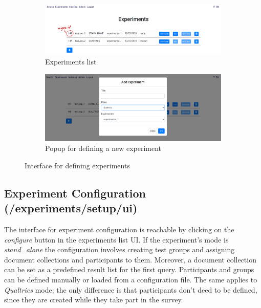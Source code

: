 \documentclass[fleqn]{article}
\begin{document}
\begin{figure} [h]
     \centering
     \begin{subfigure}[b]{0.8\textwidth}
         \centering
         \includegraphics[width=\textwidth]{img/experiments_1}
         \caption{Experiments list}
         \label{fig:experimentsUi1}
     \end{subfigure}
     \par\bigskip
     \begin{subfigure}[b]{0.8\textwidth}
         \centering
         \includegraphics[width=\textwidth]{img/experiments_2}
         \caption{Popup for defining a new experiment}
         \label{fig:experimentsUi2}
     \end{subfigure}
     \caption{Interface for defining experiments}
     \label{fig:experimentsUi}
\end{figure}


\subsection{Experiment Configuration \small{(/experiments/setup/ui)}}

The interface for experiment configuration is reachable by clicking on the \emph{configure} button in the
experiments list UI. If the experiment's mode is \emph{stand\_alone} the configuration involves creating test groups and assigning 
document collections and participants to them. Moreover, a document collection can be set as a predefined result list for the first query.
Participants and groups can be defined manually or loaded from a configuration file. The same applies to \emph{Qualtrics} mode; the only difference is that 
participants don't deed to be defined, since they are created while
they take part in the survey.
\end{document}
